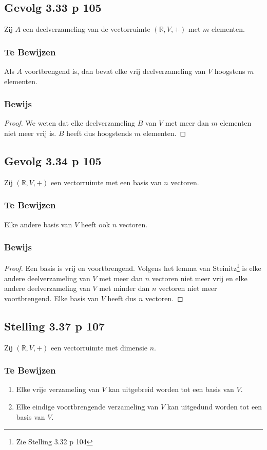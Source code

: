 \documentclass[lineaire_algebra_oplossingen.tex]{subfiles}
\begin{document}
\subsection{Gevolg 3.33 p 105}
Zij $A$ een deelverzameling van de vectorruimte $(\mathbb{R},V,+)$ met $m$ elementen.
\subsubsection*{Te Bewijzen}
Als $A$ voortbrengend is, dan bevat elke vrij deelverzameling van $V$ hoogstens $m$ elementen.
\subsubsection*{Bewijs}
\begin{proof}
We weten dat elke deelverzameling $B$ van $V$ met meer dan $m$ elementen niet meer vrij is. $B$ heeft dus hoogstends $m$ elementen.
\end{proof}

\subsection{Gevolg 3.34 p 105}
Zij $(\mathbb{R},V,+)$ een vectorruimte met een basis van $n$ vectoren.
\subsubsection*{Te Bewijzen}
Elke andere basis van $V$ heeft ook $n$ vectoren.
\subsubsection*{Bewijs}
\begin{proof}
Een basis is vrij en voortbrengend.
Volgens het lemma van Steinitz\footnote{Zie Stelling 3.32 p 104} is elke andere deelverzameling van $V$ met meer dan $n$ vectoren niet meer vrij en elke andere deelverzameling van $V$ met minder dan $n$ vectoren niet meer voortbrengend. Elke basis van $V$ heeft dus $n$ vectoren.
\end{proof}

\subsection{Stelling 3.37 p 107}
Zij $(\mathbb{R},V,+)$ een vectorruimte met dimensie $n$.
\subsubsection*{Te Bewijzen}
\begin{enumerate}
\item Elke vrije verzameling van $V$ kan uitgebreid worden tot een basis van $V$.
\item Elke eindige voortbrengende verzameling van $V$ kan uitgedund worden tot een basis van $V$.
\end{enumerate}
\end{document}
